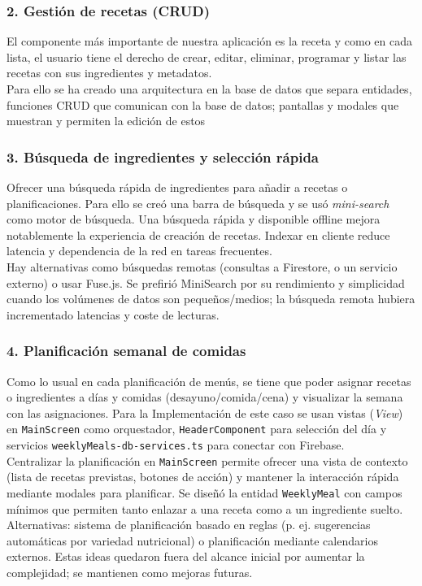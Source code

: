 \documentclass[twoside, openright, 11pt]{report}
\begin{document}
		\subsubsection{2. Gestión de recetas (CRUD)}
			El componente más importante de nuestra aplicación es la receta y como en cada lista, el usuario tiene el derecho de crear, editar, eliminar, programar y listar las recetas con sus ingredientes y metadatos.\\
			Para ello se ha creado una arquitectura en la base de datos que separa entidades, funciones CRUD que comunican con la base de datos; pantallas y modales que muestran y permiten la edición de estos
		
		\subsubsection{3. Búsqueda de ingredientes y selección rápida}
			Ofrecer una búsqueda rápida de ingredientes para añadir a recetas o planificaciones. Para ello se creó una barra de búsqueda y se usó \textit{mini-search} como motor de búsqueda. Una búsqueda rápida y disponible offline mejora notablemente la experiencia de creación de recetas. Indexar en cliente reduce latencia y dependencia de la red en tareas frecuentes.\\
			Hay alternativas como búsquedas remotas (consultas a Firestore, o un servicio externo) o usar Fuse.js. Se prefirió MiniSearch por su rendimiento y simplicidad cuando los volúmenes de datos son pequeños/medios; la búsqueda remota hubiera incrementado latencias y coste de lecturas.
		
		\subsubsection{4. Planificación semanal de comidas}
			Como lo usual en cada planificación de menús, se tiene que poder asignar recetas o ingredientes a días y comidas (desayuno/comida/cena) y visualizar la semana con las asignaciones.  
			Para la Implementación de este caso se usan vistas (\textit{View}) en \texttt{MainScreen} como orquestador, \texttt{HeaderComponent} para selección del día y servicios \texttt{weeklyMeals-db-services.ts} para conectar con Firebase.\\
			Centralizar la planificación en \texttt{MainScreen} permite ofrecer una vista de contexto (lista de recetas previstas, botones de acción) y mantener la interacción rápida mediante modales para planificar. Se diseñó la entidad \texttt{WeeklyMeal} con campos mínimos que permiten tanto enlazar a una receta como a un ingrediente suelto.  
			Alternativas: sistema de planificación basado en reglas (p. ej. sugerencias automáticas por variedad nutricional) o planificación mediante calendarios externos. Estas ideas quedaron fuera del alcance inicial por aumentar la complejidad; se mantienen como mejoras futuras.
		
\end{document}
